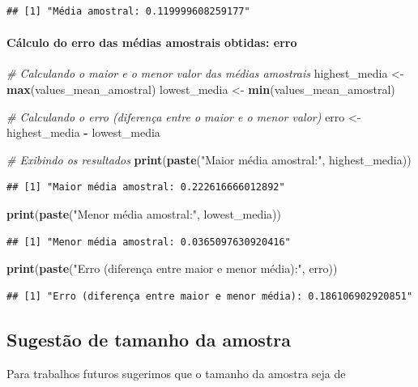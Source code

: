 \documentclass[
]{article}
\newenvironment{Shaded}{\begin{snugshade}}{\end{snugshade}}
\newcommand{\CommentTok}[1]{\textcolor[rgb]{0.56,0.35,0.01}{\textit{#1}}}
\newcommand{\FunctionTok}[1]{\textcolor[rgb]{0.13,0.29,0.53}{\textbf{#1}}}
\newcommand{\NormalTok}[1]{#1}
\newcommand{\OtherTok}[1]{\textcolor[rgb]{0.56,0.35,0.01}{#1}}
\newcommand{\SpecialCharTok}[1]{\textcolor[rgb]{0.81,0.36,0.00}{\textbf{#1}}}
\newcommand{\StringTok}[1]{\textcolor[rgb]{0.31,0.60,0.02}{#1}}
\begin{document}
\begin{verbatim}
## [1] "Média amostral: 0.119999608259177"
\end{verbatim}

\paragraph{Cálculo do erro das médias amostrais obtidas:
erro}\label{cuxe1lculo-do-erro-das-muxe9dias-amostrais-obtidas-erro}

\begin{Shaded}
\begin{Highlighting}[]
\CommentTok{\# Calculando o maior e o menor valor das médias amostrais}
\NormalTok{highest\_media }\OtherTok{\textless{}{-}} \FunctionTok{max}\NormalTok{(values\_mean\_amostral)}
\NormalTok{lowest\_media }\OtherTok{\textless{}{-}} \FunctionTok{min}\NormalTok{(values\_mean\_amostral)}

\CommentTok{\# Calculando o erro (diferença entre o maior e o menor valor)}
\NormalTok{erro }\OtherTok{\textless{}{-}}\NormalTok{ highest\_media }\SpecialCharTok{{-}}\NormalTok{ lowest\_media}

\CommentTok{\# Exibindo os resultados}
\FunctionTok{print}\NormalTok{(}\FunctionTok{paste}\NormalTok{(}\StringTok{"Maior média amostral:"}\NormalTok{, highest\_media))}
\end{Highlighting}
\end{Shaded}

\begin{verbatim}
## [1] "Maior média amostral: 0.222616666012892"
\end{verbatim}

\begin{Shaded}
\begin{Highlighting}[]
\FunctionTok{print}\NormalTok{(}\FunctionTok{paste}\NormalTok{(}\StringTok{"Menor média amostral:"}\NormalTok{, lowest\_media))}
\end{Highlighting}
\end{Shaded}

\begin{verbatim}
## [1] "Menor média amostral: 0.0365097630920416"
\end{verbatim}

\begin{Shaded}
\begin{Highlighting}[]
\FunctionTok{print}\NormalTok{(}\FunctionTok{paste}\NormalTok{(}\StringTok{"Erro (diferença entre maior e menor média):"}\NormalTok{, erro))}
\end{Highlighting}
\end{Shaded}

\begin{verbatim}
## [1] "Erro (diferença entre maior e menor média): 0.186106902920851"
\end{verbatim}

\subsection{Sugestão de tamanho da
amostra}\label{sugestuxe3o-de-tamanho-da-amostra}

Para trabalhos futuros sugerimos que o tamanho da amostra seja de
\end{document}
